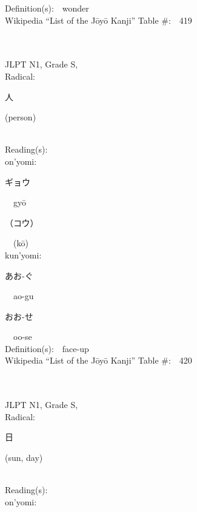 \begin{multicols}{2}
Definition(s):\ \ wonder \\
Wikipedia ``List of the J\=oy\=o Kanji'' Table \#:\ \ 419 \\
\ \ \\
{\fontsize{34pt}{40pt}  }\ \ \\
{JLPT N1, Grade S, \\Radical:\ \ {\begin{CJK}{UTF8}{min} 人 \end{CJK}} (person) } \\
Reading(s):\ \ \\
{\hspace*{1em}}on'yomi:\ \ \\
{\hspace*{2em}}{\begin{CJK}{UTF8}{min} ギョウ \end{CJK}}\ \ gy\=o\ \ \\
{\hspace*{2em}}{\begin{CJK}{UTF8}{min} （コウ） \end{CJK}}\ \ (k\=o)\ \ \\
{\hspace*{1em}}kun'yomi:\ \ \\
{\hspace*{2em}}{\begin{CJK}{UTF8}{min} あお-ぐ \end{CJK}}\ \ ao-gu\ \ \\
{\hspace*{2em}}{\begin{CJK}{UTF8}{min} おお-せ \end{CJK}}\ \ oo-se\ \ \\
Definition(s):\ \ face-up \\
Wikipedia ``List of the J\=oy\=o Kanji'' Table \#:\ \ 420 \\
\ \ \\
{\fontsize{34pt}{40pt}  }\ \ \\
{JLPT N1, Grade S, \\Radical:\ \ {\begin{CJK}{UTF8}{min} 日 \end{CJK}} (sun, day) } \\
Reading(s):\ \ \\
{\hspace*{1em}}on'yomi:\ \ \\

\end{multicols}
